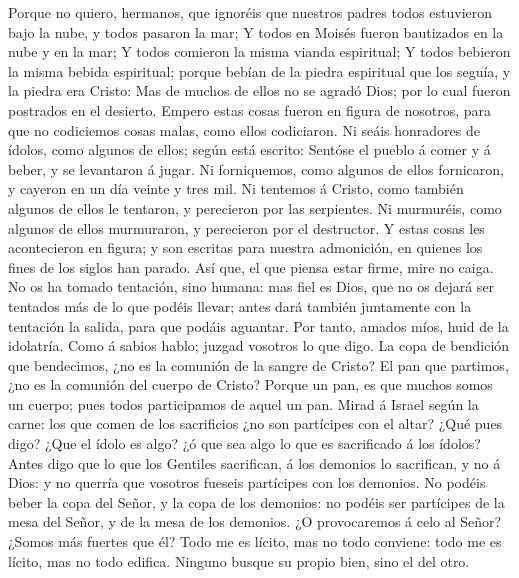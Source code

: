  Porque no quiero, hermanos, que ignoréis que nuestros
padres todos estuvieron bajo la nube, y todos pasaron la mar;
 Y todos en Moisés fueron bautizados en la nube y en la mar;
 Y todos comieron la misma vianda espiritual;  Y
todos bebieron la misma bebida espiritual; porque bebían de la piedra
espiritual que los seguía, y la piedra era Cristo:  Mas de
muchos de ellos no se agradó Dios; por lo cual fueron postrados en el
desierto.  Empero estas cosas fueron en figura de nosotros,
para que no codiciemos cosas malas, como ellos codiciaron. 
Ni seáis honradores de ídolos, como algunos de ellos; según está
escrito: Sentóse el pueblo á comer y á beber, y se levantaron á jugar.
 Ni forniquemos, como algunos de ellos fornicaron, y cayeron
en un día veinte y tres mil.  Ni tentemos á Cristo, como
también algunos de ellos le tentaron, y perecieron por las serpientes.
 Ni murmuréis, como algunos de ellos murmuraron, y
perecieron por el destructor.  Y estas cosas les
acontecieron en figura; y son escritas para nuestra admonición, en
quienes los fines de los siglos han parado.  Así que, el
que piensa estar firme, mire no caiga.  No os ha tomado
tentación, sino humana: mas fiel es Dios, que no os dejará ser tentados
más de lo que podéis llevar; antes dará también juntamente con la
tentación la salida, para que podáis aguantar.  Por tanto,
amados míos, huid de la idolatría.  Como á sabios hablo;
juzgad vosotros lo que digo.  La copa de bendición que
bendecimos, ¿no es la comunión de la sangre de Cristo? El pan que
partimos, ¿no es la comunión del cuerpo de Cristo?  Porque
un pan, es que muchos somos un cuerpo; pues todos participamos de aquel
un pan.  Mirad á Israel según la carne: los que comen de
los sacrificios ¿no son partícipes con el altar?  ¿Qué pues
digo? ¿Que el ídolo es algo? ¿ó que sea algo lo que es sacrificado á los
ídolos?  Antes digo que lo que los Gentiles sacrifican, á
los demonios lo sacrifican, y no á Dios: y no querría que vosotros
fueseis partícipes con los demonios.  No podéis beber la
copa del Señor, y la copa de los demonios: no podéis ser partícipes de
la mesa del Señor, y de la mesa de los demonios.  ¿O
provocaremos á celo al Señor? ¿Somos más fuertes que él? 
Todo me es lícito, mas no todo conviene: todo me es lícito, mas no todo
edifica.  Ninguno busque su propio bien, sino el del otro.
